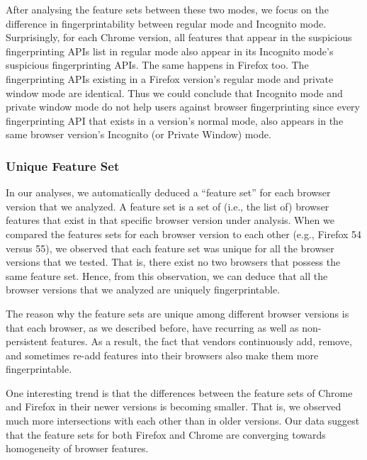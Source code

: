After analysing the feature sets between these two modes, we focus on the difference 
in fingerprintability between regular mode and Incognito mode.
Surprisingly, for each Chrome version, all features that appear in the suspicious fingerprinting
APIs list in regular mode also appear in its Incognito mode's suspicious fingerprinting APIs.
The same happens in Firefox too. The fingerprinting APIs existing in a Firefox version's regular mode and private
window mode are identical. Thus we could conclude that Incognito mode and
private window mode do not help users against browser fingerprinting since every fingerprinting API that exists in
a version's normal mode, also appears in the same browser version's Incognito (or Private Window) mode.


\subsubsection{Unique Feature Set}

In our analyses, we automatically deduced a ``feature set'' for each
browser version that we analyzed. A feature set is a set of (i.e., the
list of) browser features that exist in that specific browser version
under analysis. When we compared the features sets for each browser
version to each other (e.g., Firefox 54 versus 55), we observed that
each feature set was unique for all the browser versions that we
tested. That is, there exist no two browsers that possess the same
feature set. Hence, from this observation, we can deduce that all the
browser versions that we analyzed are uniquely fingerprintable.

The reason why the feature sets are unique among different browser
versions is that each browser, as we described before, have recurring
as well as non-persistent features. As a result, the fact that vendors
continuously add, remove, and sometimes re-add features into their
browsers also make them more fingerprintable.


One interesting trend is that the differences between the feature sets
of Chrome and Firefox in their newer versions is becoming smaller.
That is, we observed much more intersections with each other than in
older versions. Our data suggest that the feature sets for both
Firefox and Chrome are converging towards homogeneity of browser
features.
